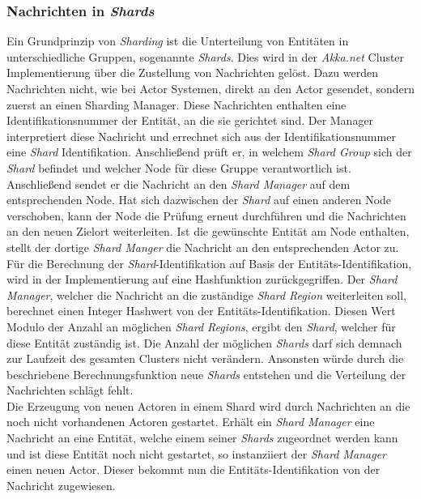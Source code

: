 \subsubsection{Nachrichten in \textit{Shards}}
Ein Grundprinzip von \textit{Sharding} ist die Unterteilung von Entitäten in unterschiedliche Gruppen, sogenannte \textit{Shards}. Dies wird in der \textit{Akka.net} Cluster Implementierung über die Zustellung von Nachrichten gelöst. Dazu werden Nachrichten nicht, wie bei Actor Systemen, direkt an den Actor gesendet, sondern zuerst an einen Sharding Manager. Diese Nachrichten enthalten eine Identifikationsnummer der Entität, an die sie gerichtet sind. Der Manager interpretiert diese Nachricht und errechnet sich aus der Identifikationsnummer eine \textit{Shard} Identifikation. Anschließend prüft er, in welchem \textit{Shard Group} sich der \textit{Shard} befindet und welcher Node für diese Gruppe verantwortlich ist. Anschließend sendet er die Nachricht an den \textit{Shard Manager} auf dem entsprechenden Node. Hat sich dazwischen der \textit{Shard} auf einen anderen Node verschoben, kann der Node die Prüfung erneut durchführen und die Nachrichten an den neuen Zielort weiterleiten. Ist  die gewünschte Entität am Node enthalten, stellt der dortige \textit{Shard Manger} die Nachricht an den entsprechenden Actor zu. \\
Für die Berechnung der \textit{Shard}-Identifikation auf Basis der Entitäts-Identifikation, wird in der Implementierung auf eine Hashfunktion zurückgegriffen. Der \textit{Shard Manager}, welcher die Nachricht an die zuständige \textit{Shard Region} weiterleiten soll, berechnet einen Integer Hashwert von der Entitäts-Identifikation. Diesen Wert Modulo der Anzahl an möglichen \textit{Shard Regions}, ergibt den \textit{Shard}, welcher für diese Entität zuständig ist. Die Anzahl der möglichen \textit{Shards} darf sich demnach zur Laufzeit des gesamten Clusters nicht verändern. Ansonsten würde durch die beschriebene Berechnungsfunktion neue \textit{Shards} entstehen und die Verteilung der Nachrichten schlägt fehlt. \\
Die Erzeugung von neuen Actoren in einem Shard wird durch Nachrichten an die noch nicht vorhandenen Actoren gestartet. Erhält ein \textit{Shard Manager} eine Nachricht an eine Entität, welche einem seiner \textit{Shards} zugeordnet werden kann und ist diese Entität noch nicht gestartet, so instanziiert der \textit{Shard Manager} einen neuen Actor. Dieser bekommt nun die Entitäts-Identifikation von der Nachricht zugewiesen.
